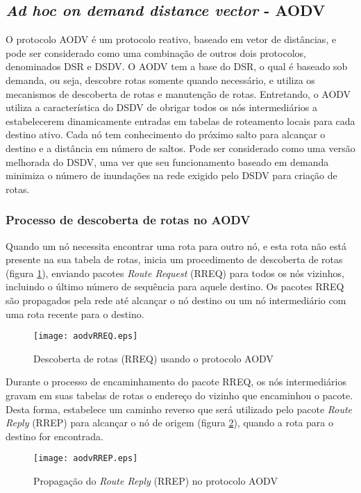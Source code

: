 \subsection{\textit{Ad hoc on demand distance vector} - AODV}
O protocolo AODV \'e um protocolo reativo, baseado em vetor de dist\^ancias, e pode ser considerado como uma combina\c{c}\~ao de outros dois protocolos, denominados DSR e DSDV. 
O AODV tem a base do DSR, o qual \'e baseado sob demanda, ou seja, descobre rotas somente quando necess\'ario, e utiliza os mecanismos de descoberta de rotas e manuten\c{c}\~ao de rotas.
Entretando, o AODV utiliza a caracter\'istica do DSDV de obrigar todos os n\'os intermedi\'arios a estabelecerem dinamicamente entradas em tabelas de roteamento locais para cada destino ativo.
Cada n\'o tem conhecimento do pr\'oximo salto para alcan\c{c}ar o destino e a dist\^ancia em n\'umero de saltos.
Pode ser considerado como uma vers\~ao melhorada do DSDV, uma ver que seu funcionamento baseado em demanda minimiza o n\'umero de inunda\c{c}\~oes na rede exigido pelo DSDV para cria\c{c}\~ao de rotas.

\subsubsection{Processo de descoberta de rotas no AODV}
Quando um n\'o necessita encontrar uma rota para outro n\'o, e esta rota n\~ao est\'a presente na sua tabela de rotas, inicia um procedimento de descoberta de rotas (figura \ref{figAodvRreq}), enviando pacotes \textit{Route Request} (RREQ) para todos os n\'os vizinhos, incluindo o \'ultimo n\'umero de sequ\^encia para aquele destino. 
Os pacotes RREQ s\~ao propagados pela rede at\'e alcan\c{c}ar o n\'o destino ou um n\'o intermedi\'ario com uma rota recente para o destino.

\begin{figure}[H]
	\centering
	\texttt{[image: aodvRREQ.eps]}
	\caption{Descoberta de rotas (RREQ) usando o protocolo AODV \cite{pereira}}
	\label{figAodvRreq}
\end{figure}

Durante o processo de encaminhamento do pacote RREQ, os n\'os intermedi\'arios gravam em suas tabelas de rotas o endere\c{c}o do vizinho que encaminhou o pacote. 
Desta forma, estabelece um caminho reverso que ser\'a utilizado pelo pacote \textit{Route Reply} (RREP) para alcan\c{c}ar o n\'o de origem (figura \ref{figAodvRrep}), quando a rota para o destino for encontrada.

\begin{figure}[H]
	\centering
	\texttt{[image: aodvRREP.eps]}
	\caption{Propaga\c{c}\~ao do \textit{Route Reply} (RREP) no protocolo AODV \cite{pereira}}
	\label{figAodvRrep}
\end{figure}


